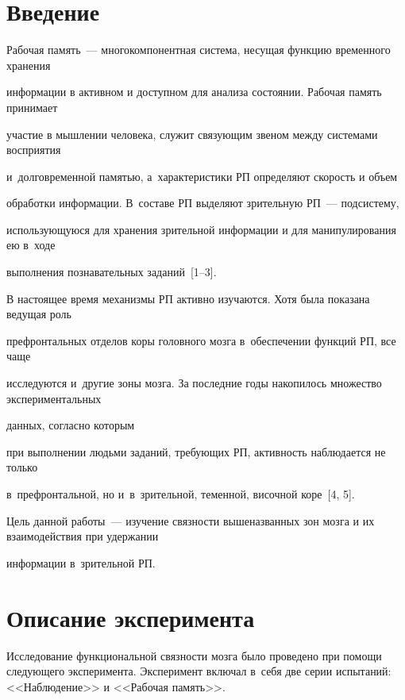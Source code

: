 \section{Введение}





Рабочая память~--- многокомпонентная система, несущая функцию временного хранения 


информации в активном и доступном для анализа состоянии. Рабочая память принимает


участие в мышлении человека, служит связующим звеном между системами восприятия 


и~долговременной памятью, а~характеристики РП определяют скорость и объем


обработки информации. В~составе РП выделяют зрительную РП~--- подсистему, 


ис\-поль\-зу\-ющу\-юся для хранения зрительной информации и для манипулирования ею в~ходе


выполнения познавательных заданий~[1--3].





В настоящее время механизмы РП активно изучаются. Хотя была показана ведущая роль 


префронтальных отделов коры головного мозга в~обеспечении функций РП, все чаще 


исследуются и~другие зоны мозга. За последние годы накопилось множество экспериментальных 


данных, согласно которым


при выполнении людьми заданий, требующих РП, активность наблюдается не только 


в~префронтальной, но и~в~зрительной, теменной, височной коре~[4, 5].


Цель данной работы~--- изучение связности вышеназванных зон мозга и их взаимодействия при удержании 


информации в~зрительной РП.








\section{Описание эксперимента}





Исследование функциональной связности мозга было проведено при помощи следующего эксперимента. Эксперимент включал в~себя две серии испытаний: <<Наблюдение>> и <<Рабочая память>>.


